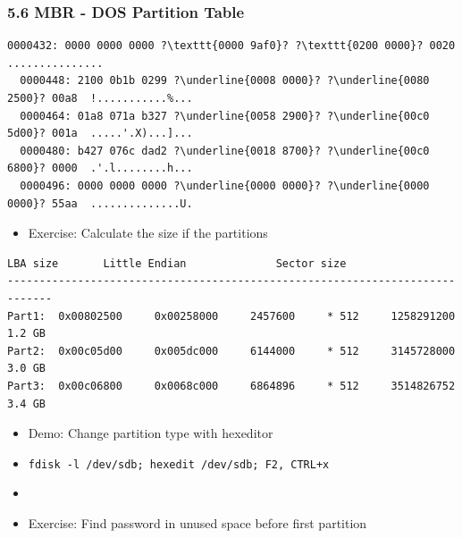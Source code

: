 \begin{frame}[fragile]
  \frametitle{5.6 MBR - DOS Partition Table}
  \begin{lstlisting}[basicstyle=\tiny,escapechar=\?]
  0000432: 0000 0000 0000 ?\texttt{0000 9af0}? ?\texttt{0200 0000}? 0020  ............... 
  0000448: 2100 0b1b 0299 ?\underline{0008 0000}? ?\underline{0080 2500}? 00a8  !...........%...
  0000464: 01a8 071a b327 ?\underline{0058 2900}? ?\underline{00c0 5d00}? 001a  .....'.X)...]...
  0000480: b427 076c dad2 ?\underline{0018 8700}? ?\underline{00c0 6800}? 0000  .'.l........h...
  0000496: 0000 0000 0000 ?\underline{0000 0000}? ?\underline{0000 0000}? 55aa  ..............U.

  \end{lstlisting}
    \begin{itemize}
        \item Exercise: Calculate the size if the partitions
    \end{itemize}
  \begin{lstlisting}[basicstyle=\tiny]
        LBA size       Little Endian              Sector size
-----------------------------------------------------------------------------
Part1:  0x00802500     0x00258000     2457600     * 512     1258291200   1.2 GB
Part2:  0x00c05d00     0x005dc000     6144000     * 512     3145728000   3.0 GB
Part3:  0x00c06800     0x0068c000     6864896     * 512     3514826752   3.4 GB
  \end{lstlisting}
    \begin{itemize}
        \item Demo:     Change partition type with hexeditor
	\item[] \texttt{fdisk -l /dev/sdb; hexedit /dev/sdb; F2, CTRL+x}
	\item[]
        \item Exercise: Find password in unused space before first partition
    \end{itemize}
\end{frame}


